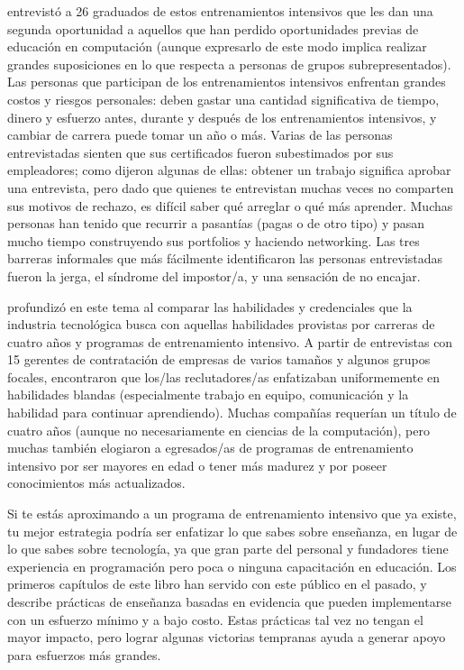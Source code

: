 \cite{Thay2017} entrevistó a 26 graduados de estos entrenamientos intensivos
que les dan una segunda oportunidad a aquellos que han perdido oportunidades previas de educación en computación
(aunque expresarlo de este modo implica realizar grandes suposiciones 
en lo que respecta a  personas de grupos subrepresentados).
Las personas que participan de los entrenamientos intensivos enfrentan grandes costos y riesgos personales:
deben gastar una cantidad significativa de tiempo, dinero y esfuerzo antes, 
durante y después de los entrenamientos intensivos, y cambiar de carrera puede tomar un año o más.
Varias de las personas entrevistadas sienten que sus certificados fueron subestimados por sus empleadores;
como dijeron algunas de ellas:
obtener un trabajo significa aprobar una entrevista,
pero dado que quienes te entrevistan muchas veces no comparten sus motivos de rechazo,
es difícil saber qué arreglar o qué más aprender.
Muchas personas han tenido que recurrir a pasantías (pagas o de otro tipo)
y pasan mucho tiempo construyendo sus portfolios y haciendo networking.
Las tres barreras informales que más fácilmente identificaron las personas entrevistadas fueron la jerga,
el síndrome del impostor/a, y una sensación de no encajar.

\cite{Burk2018} profundizó en este tema
al comparar las habilidades y credenciales 
que la industria tecnológica busca con aquellas habilidades provistas por carreras de cuatro años y programas de entrenamiento intensivo.
A partir de entrevistas con 15 gerentes de contratación de empresas de varios tamaños y algunos grupos focales,
encontraron que los/las reclutadores/as enfatizaban uniformemente en habilidades blandas
(especialmente trabajo en equipo, comunicación y la habilidad para continuar aprendiendo).
Muchas compañías requerían un título de cuatro años
(aunque no necesariamente en ciencias de la computación),
pero muchas también elogiaron a egresados/as de programas de entrenamiento intensivo por ser mayores en edad o tener más madurez
y por poseer conocimientos más actualizados.

Si te estás aproximando a un programa de entrenamiento intensivo que ya existe,
tu mejor estrategia podría ser enfatizar lo que sabes sobre enseñanza,
en lugar de lo que sabes sobre tecnología,
ya que gran parte del personal y fundadores tiene experiencia en programación
pero poca o ninguna capacitación en educación.
Los primeros capítulos de este libro han servido con este público en el pasado, 
y ~\cite{Lang2016} describe
prácticas de enseñanza basadas en evidencia que pueden implementarse
con un esfuerzo mínimo y a bajo costo.
Estas prácticas tal vez no tengan el mayor impacto, 
pero lograr algunas victorias tempranas ayuda a generar apoyo para esfuerzos más grandes.


